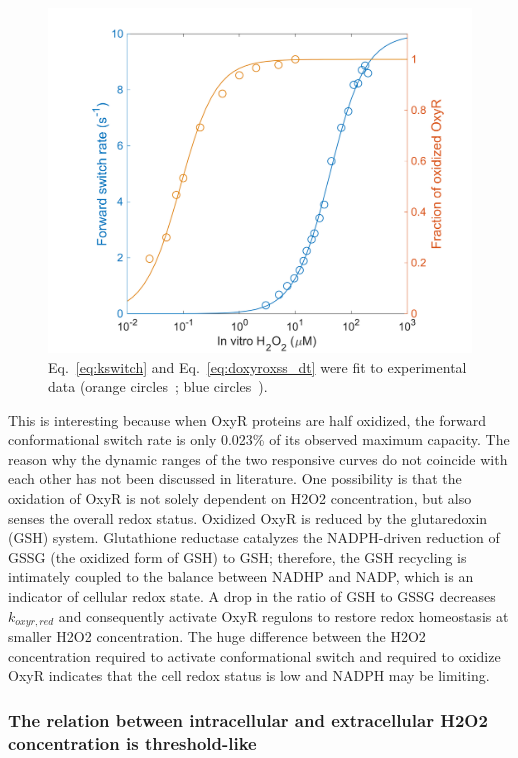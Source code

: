 \documentclass[10pt]{article}
\begin{document}
\begin{figure}[H]
\centering
  \includegraphics[width=0.5\linewidth]{prediction_oxyr_kinetics_fraction.png}
  \caption{Eq.~\ref{eq:kswitch} and Eq.~\ref{eq:doxyroxss_dt} were fit to experimental data (orange circles~\cite{aaslund1999regulation}; blue circles~\cite{lee2004redox}).}
  \label{fig:fit_oxyr_paras}
\end{figure}

This is interesting because when OxyR proteins are half oxidized, the forward conformational switch rate is only 0.023\% of its observed maximum capacity. The reason why the dynamic ranges of the two responsive curves do not coincide with each other has not been discussed in literature. One possibility is that the oxidation of OxyR is not solely dependent on H2O2 concentration, but also senses the overall redox status. Oxidized OxyR is reduced by the glutaredoxin (GSH) system. Glutathione reductase catalyzes the NADPH-driven reduction of GSSG (the oxidized form of GSH) to GSH; therefore, the GSH recycling is intimately coupled to the balance between NADHP and NADP, which is an indicator of cellular redox state. A drop in the ratio of GSH to GSSG decreases $k_{oxyr,red}$ and consequently activate OxyR regulons to restore redox homeostasis at smaller H2O2 concentration. The huge difference between the H2O2 concentration required to activate conformational switch and required to oxidize OxyR indicates that the cell redox status is low and NADPH may be limiting.

\subsubsection{The relation between intracellular and extracellular H2O2 concentration is threshold-like}
\end{document}
